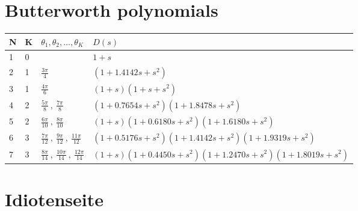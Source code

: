 
\appendix

\section{Butterworth polynomials}\label{app:Butterworth}

\begin{tabular}{|l|l|l|l|}
	\hline
	N & K & $\theta_1,\theta_2,\ldots,\theta_K$ & $D(s)$ \\ \hline
	1 & 0 & & $1+s$ \\ \hline
	2 & 1 & $\frac{3\pi}{4}$ & $(1 + 1.4142s + s^2)$ \\ \hline
	3 & 1 & $\frac{4\pi}{6}$ & $(1+s)(1+s+s^2)$ \\ \hline
	4 & 2 & $\frac{5\pi}{8}\:,\:\frac{7\pi}{8}$ & $(1+0.7654s+s^2)(1+1.8478s+s^2)$ \\ \hline
	5 & 2 & $\frac{6\pi}{10}\:,\:\frac{8\pi}{10}$ & $(1+s)(1+0.6180s+s^2)(1+1.6180s+s^2)$ \\ \hline
	6 & 3 & $\frac{7\pi}{12}\:,\:\frac{9\pi}{12}\:,\:\frac{11\pi}{12}$ & $(1+0.5176s+s^2)(1+1.4142s+s^2)(1+1.9319s+s^2)$ \\ \hline
	7 & 3 & $\frac{8\pi}{14}\:,\:\frac{10\pi}{14}\:,\:\frac{12\pi}{14}$ & $(1+s)(1+0.4450s+s^2)(1+1.2470s+s^2)(1+1.8019s+s^2)$ \\ \hline
\end{tabular}

\section{Idiotenseite}\label{app:Idiotenseite}



\begin{multicols}{2}






\end{multicols}


